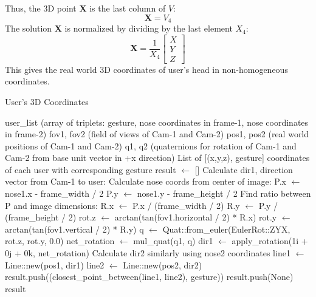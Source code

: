 Thus, the 3D point \( \mathbf{X} \) is the last column of \( V \):
\[
	\mathbf{X} = V_4
\]
The solution \( \mathbf{X} \) is normalized by dividing by the last element \( X_4 \):
\[
	\mathbf{X} = \frac{1}{X_4} \begin{bmatrix} X \\ Y \\ Z \end{bmatrix}
\]
This gives the real world 3D coordinates of user's head in non-homogeneous coordinates.



\begin{algorithm}[H]
	\caption{User's 3D Coordinates}
	\begin{algorithmic}[1]
		\Require user\_list (array of triplets: gesture, nose coordinates in frame-1, nose coordinates in frame-2)
		\Require fov1, fov2 (field of views of Cam-1 and Cam-2)
		\Require pos1, pos2 (real world positions of Cam-1 and Cam-2)
		\Require q1, q2 (quaternions for rotation of Cam-1 and Cam-2 from base unit vector in +x direction)
		\Ensure List of [(x,y,z), gesture] coordinates of each user with corresponding gesture
		\State result $\gets$ []
		\State Calculate dir1, direction vector from Cam-1 to user:
		\State Calculate nose coords from center of image:
		\State P.x $\gets$ nose1.x - frame\_width / 2
		\State P.y $\gets$ nose1.y - frame\_height / 2
		\State Find ratio between P and image dimensions:
		\State R.x $\gets$ P.x / (frame\_width / 2)
		\State R.y $\gets$ P.y / (frame\_height / 2)
		\State rot.z $\gets$ arctan(tan(fov1.horizontal / 2) * R.x)
		\State rot.y $\gets$ arctan(tan(fov1.vertical / 2) * R.y)
		\State q $\gets$ Quat::from\_euler(EulerRot::ZYX, rot.z, rot.y, 0.0)
		\State net\_rotation $\gets$ mul\_quat(q1, q)
		\State dir1 $\gets$ apply\_rotation(1i + 0j + 0k, net\_rotation)
		\State Calculate dir2 similarly using nose2 coordinates
		\State line1 $\gets$ Line::new(pos1, dir1)
		\State line2 $\gets$ Line::new(pos2, dir2)
		\State result.push((closest\_point\_between(line1, line2), gesture))
		\Else
		\State result.push(None)
		\EndIf
		\EndFor
		\State \Return result
	\end{algorithmic}
\end{algorithm}

